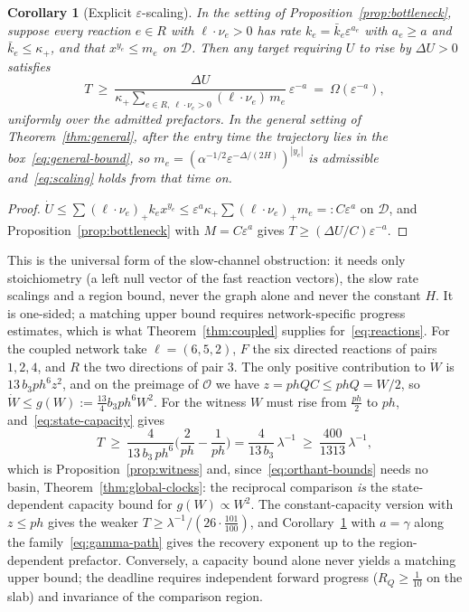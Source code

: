 \documentclass[11pt,a4paper]{article}
\theoremstyle{plain}
\newtheorem{corollary}[theorem]{Corollary}
\theoremstyle{definition}
\theoremstyle{remark}
\newcommand{\eps}{\varepsilon}
\newcommand{\calO}{\mathcal O}
\newcommand{\calD}{\mathcal D}
\begin{document}
\begin{corollary}[Explicit $\eps$-scaling]\label{cor:scaling}
In the setting of Proposition~\ref{prop:bottleneck}, suppose every reaction $e\in R$ with $\ell\cdot\nu_e>0$ has rate $k_e=\bar k_e\eps^{a_e}$ with $a_e\ge a$ and $\bar k_e\le\kappa_+$, and that $x^{y_e}\le m_e$ on $\calD$. Then any target requiring $U$ to rise by $\Delta U>0$ satisfies
\begin{equation}\label{eq:scaling}
 T\ \ge\ \frac{\Delta U}{\kappa_+\sum_{e\in R,\ \ell\cdot\nu_e>0}(\ell\cdot\nu_e)\,m_e}\ \eps^{-a}\ =\ \Omega(\eps^{-a}),
\end{equation}
uniformly over the admitted prefactors. In the general setting of Theorem~\ref{thm:general}, after the entry time the trajectory lies in the box~\eqref{eq:general-bound}, so $m_e=(\alpha^{-1/2}\eps^{-\Delta/(2H)})^{|y_e|}$ is admissible and~\eqref{eq:scaling} holds from that time on.
\end{corollary}

\begin{proof}
$\dot U\le\sum(\ell\cdot\nu_e)_+k_ex^{y_e}\le\eps^a\kappa_+\sum(\ell\cdot\nu_e)_+m_e=:C\eps^a$ on $\calD$, and Proposition~\ref{prop:bottleneck} with $M=C\eps^a$ gives $T\ge(\Delta U/C)\eps^{-a}$.
\end{proof}

This is the universal form of the slow-channel obstruction: it needs only stoichiometry (a left null vector of the fast reaction vectors), the slow rate scalings and a region bound, never the graph alone and never the constant $H$. It is one-sided; a matching upper bound requires network-specific progress estimates, which is what Theorem~\ref{thm:coupled} supplies for~\eqref{eq:reactions}. For the coupled network take $\ell=(6,5,2)$, $F$ the six directed reactions of pairs $1,2,4$, and $R$ the two directions of pair $3$. The only positive contribution to $\dot W$ is $13\,b_3ph^6z^2$, and on the preimage of $\calO$ we have $z=phQC\le phQ=W/2$, so $\dot W\le g(W):=\tfrac{13}{4}b_3ph^6W^2$. For the witness $W$ must rise from $\tfrac{ph}{2}$ to $ph$, and~\eqref{eq:state-capacity} gives
\[
 T\ \ge\ \frac{4}{13\,b_3\,ph^6}\Big(\frac{2}{ph}-\frac1{ph}\Big)=\frac{4}{13\,b_3}\,\lambda^{-1}\ \ge\ \frac{400}{1313}\,\lambda^{-1},
\]
which is Proposition~\ref{prop:witness} and, since~\eqref{eq:orthant-bounds} needs no basin, Theorem~\ref{thm:global-clocks}: the reciprocal comparison \emph{is} the state-dependent capacity bound for $g(W)\propto W^2$. The constant-capacity version with $z\le ph$ gives the weaker $T\ge\lambda^{-1}/(26\cdot\tfrac{101}{100})$, and Corollary~\ref{cor:scaling} with $a=\gamma$ along the family~\eqref{eq:gamma-path} gives the recovery exponent up to the region-dependent prefactor. Conversely, a capacity bound alone never yields a matching upper bound; the deadline requires independent forward progress ($R_Q\ge\tfrac1{10}$ on the slab) and invariance of the comparison region.
\end{document}
